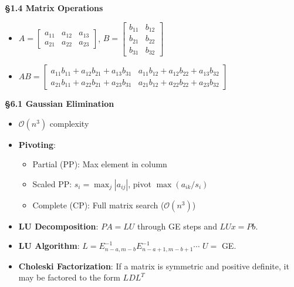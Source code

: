 \documentclass{article}
\begin{document}
\begin{tcolorbox}[colframe=black,colback=white,boxrule=0.3pt,arc=1pt,
left=0pt,right=0pt,top=0pt,bottom=0pt]
\begin{minipage}[t]{0.49\textwidth}
\textbf{\S1.4 Matrix Operations}
\begin{itemize}
\item $A = \begin{bmatrix}a_{11}&a_{12}&a_{13}\\a_{21}&a_{22}&a_{23}\end{bmatrix}$, 
$B = \begin{bmatrix}b_{11}&b_{12}\\b_{21}&b_{22}\\b_{31}&b_{32}\end{bmatrix}$
\item $AB = \begin{bmatrix}
a_{11}b_{11}+a_{12}b_{21}+a_{13}b_{31} & a_{11}b_{12}+a_{12}b_{22}+a_{13}b_{32}\\
a_{21}b_{11}+a_{22}b_{21}+a_{23}b_{31} & a_{21}b_{12}+a_{22}b_{22}+a_{23}b_{32}
\end{bmatrix}$
\end{itemize}

\textbf{\S6.1 Gaussian Elimination}
\begin{itemize}
\item $\mathcal{O}(n^3)$ complexity
\item \textbf{Pivoting}:
\begin{itemize}
\item Partial (PP): Max element in column
\item Scaled PP: $s_i=\max_j|a_{ij}|$, pivot $\max(a_{ik}/s_i)$
\item Complete (CP): Full matrix search ($\mathcal{O}(n^3)$)
\end{itemize}
\item \textbf{LU Decomposition}: $PA=LU$ through GE steps and $LUx = Pb$.
\item \textbf{LU Algorithm}: $L = E_{n-a,m-b}^{-1}E_{n-a+1,m-b+1}^{-1}\cdots$ $U = $ GE.
\item \textbf{Choleski Factorization}: If a matrix is symmetric and positive definite, it may be factored to the form $LDL^T$
\end{itemize}


\end{minipage}
\end{tcolorbox}
\end{document}
